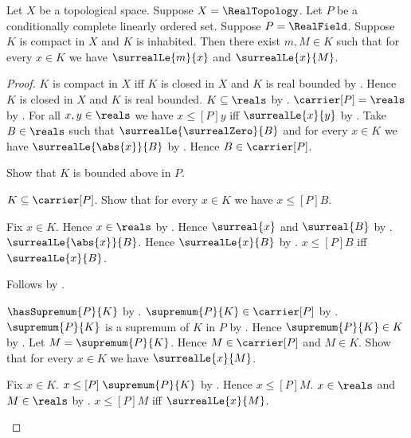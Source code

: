 \begin{theorem}\label{inhabited_compact_real_set_has_extrema}
    Let $X$ be a topological space.
    Suppose $X=\RealTopology$.
    Let $P$ be a conditionally complete linearly ordered set.
    Suppose $P=\RealField$.
    Suppose $K$ is compact in $X$ and $K$ is inhabited.
    Then there exist $m,M\in K$ such that for every $x\in K$ we have
        $\surrealLe{m}{x}$ and $\surrealLe{x}{M}$.
\end{theorem}
\begin{proof}
    $K$ is compact in $X$ iff
        $K$ is closed in $X$ and $K$ is real bounded by
        .
    Hence $K$ is closed in $X$ and $K$ is real bounded.
    $K\subseteq\reals$ by .
    $\carrier[P]=\reals$ by
        .
    For all $x,y\in\reals$ we have
        $x\mathrel{\leq[P]}y$ iff $\surrealLe{x}{y}$ by
        .
    Take $B\in\reals$ such that $\surrealLe{\surrealZero}{B}$ and
        for every $x\in K$ we have $\surrealLe{\abs{x}}{B}$ by
        .
    Hence $B\in\carrier[P]$.

    Show that $K$ is bounded above in $P$.
    \begin{subproof}
        $K\subseteq\carrier[P]$.
        Show that for every $x\in K$ we have $x\mathrel{\leq[P]}B$.
        \begin{subproof}
            Fix $x\in K$.
            Hence $x\in\reals$ by .
            Hence $\surreal{x}$ and $\surreal{B}$ by
                .
            $\surrealLe{\abs{x}}{B}$.
            Hence $\surrealLe{x}{B}$ by
                .
            $x\mathrel{\leq[P]}B$ iff $\surrealLe{x}{B}$.
        \end{subproof}
        Follows by .
    \end{subproof}
    $\hasSupremum{P}{K}$ by
        .
    $\supremum{P}{K}\in\carrier[P]$ by .
    $\supremum{P}{K}$ is a supremum of $K$ in $P$ by
        .
    Hence $\supremum{P}{K}\in K$ by
        .
    Let $M=\supremum{P}{K}$.
    Hence $M\in\carrier[P]$ and $M\in K$.
    Show that for every $x\in K$ we have $\surrealLe{x}{M}$.
    \begin{subproof}
        Fix $x\in K$.
        $x\mathrel{\leq[P]}\supremum{P}{K}$ by
            .
        Hence $x\mathrel{\leq[P]}M$.
        $x\in\reals$ and $M\in\reals$ by .
        $x\mathrel{\leq[P]}M$ iff $\surrealLe{x}{M}$.
    \end{subproof}


\end{proof}
